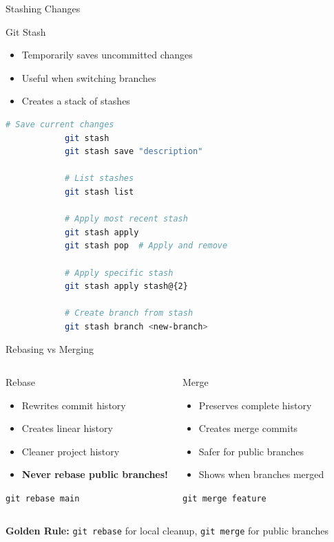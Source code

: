 \documentclass[aspectratio=169]{beamer}
\begin{document}
	\begin{frame}[fragile]{Stashing Changes}
		\begin{block}{Git Stash}
			\begin{itemize}
				\item Temporarily saves uncommitted changes
				\item Useful when switching branches
				\item Creates a stack of stashes
			\end{itemize}
		\end{block}
		
		\begin{lstlisting}[language=bash]
			# Save current changes
			git stash
			git stash save "description"
			
			# List stashes
			git stash list
			
			# Apply most recent stash
			git stash apply
			git stash pop  # Apply and remove
			
			# Apply specific stash
			git stash apply stash@{2}
			
			# Create branch from stash
			git stash branch <new-branch>
		\end{lstlisting}
	\end{frame}
	
	\begin{frame}{Rebasing vs Merging}
		\begin{columns}[T]
			\begin{block}{Rebase}
				\begin{itemize}
					\item Rewrites commit history
					\item Creates linear history
					\item Cleaner project history
					\item \textbf{Never rebase public branches!}
				\end{itemize}
				\texttt{git rebase main}
			\end{block}
			
			\begin{block}{Merge}
				\begin{itemize}
					\item Preserves complete history
					\item Creates merge commits
					\item Safer for public branches
					\item Shows when branches merged
				\end{itemize}
				\texttt{git merge feature}
			\end{block}
		\end{columns}
		
		\vspace{0.3cm}
		\begin{center}
			\textbf{Golden Rule:} \texttt{git rebase} for local cleanup, \texttt{git merge} for public branches
		\end{center}
	\end{frame}
	
\end{document}
